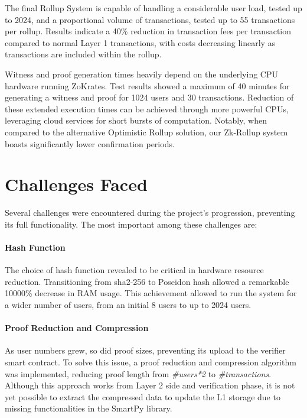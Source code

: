 The final Rollup System is capable of handling a considerable user load, tested up to 2024, and a proportional volume of transactions, tested up to 55 transactions per rollup. Results indicate a 40\% reduction in transaction fees per transaction compared to normal Layer 1 transactions, with costs decreasing linearly as transactions are included within the rollup.

Witness and proof generation times heavily depend on the underlying CPU hardware running ZoKrates. Test results showed a maximum of 40 minutes for generating a witness and proof for 1024 users and 30 transactions. Reduction of these extended execution times can be achieved through more powerful CPUs, leveraging cloud services for short bursts of computation. Notably, when compared to the alternative Optimistic Rollup solution, our Zk-Rollup system boasts significantly lower confirmation periods.

\section{Challenges Faced}

Several challenges were encountered during the project's progression, preventing its full functionality. The most important among these challenges are:
\vspace{-0.11in}
\paragraph{Hash Function} The choice of hash function revealed to be critical in hardware resource reduction. Transitioning from sha2-256 to Poseidon hash allowed a remarkable 10000\% decrease in RAM usage. This achievement allowed to run the system for a wider number of users, from an initial 8 users to up to 2024 users.
\vspace{-0.11in}
\paragraph{Proof Reduction and Compression} As user numbers grew, so did proof sizes, preventing its upload to the verifier smart contract. To solve this issue, a proof reduction and compression algorithm was implemented, reducing proof length from \textit{\#users*2} to \textit{\#transactions}. Although this approach works from Layer 2 side and verification phase, it is not yet possible to extract the compressed data to update the L1 storage due to missing functionalities in the SmartPy library.
\vspace{-0.11in}

